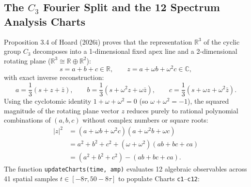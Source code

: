 \documentclass[11pt, a4paper]{article}
\begin{document}
\subsection{The \texorpdfstring{$C_3$}{C3} Fourier Split and the 12 Spectrum Analysis Charts}
Proposition 3.4 of Hoard (2026i) proves that the representation $\mathbb{R}^3$ of the cyclic group $C_3$ decomposes into a 1-dimensional fixed apex line and a 2-dimensional rotating plane ($\mathbb{R}^3 \cong \mathbb{R} \oplus \mathbb{R}^2$):
\begin{equation}
s = a + b + c \in \mathbb{R}, \qquad z = a + \omega b + \omega^2 c \in \mathbb{C},
\end{equation}
with exact inverse reconstruction:
\begin{equation}
a = \frac{1}{3}(s + z + \bar{z}), \qquad b = \frac{1}{3}(s + \omega^2 z + \omega \bar{z}), \qquad c = \frac{1}{3}(s + \omega z + \omega^2 \bar{z}).
\end{equation}
Using the cyclotomic identity $1 + \omega + \omega^2 = 0$ (so $\omega + \omega^2 = -1$), the squared magnitude of the rotating plane vector $z$ reduces purely to rational polynomial combinations of $(a,b,c)$ without complex numbers or square roots:
\begin{align}
|z|^2 &= (a + \omega b + \omega^2 c)(a + \omega^2 b + \omega c) \nonumber \\
&= a^2 + b^2 + c^2 + (\omega + \omega^2)(ab + bc + ca) \nonumber \\
&= (a^2 + b^2 + c^2) - (ab + bc + ca).
\label{eq:z-mag-sq}
\end{align}
The function \texttt{updateCharts(time, amp)} evaluates 12 algebraic observables across 41 spatial samples $t \in [-8\tau, 50 - 8\tau]$ to populate Charts \texttt{c1}--\texttt{c12}:
\end{document}
